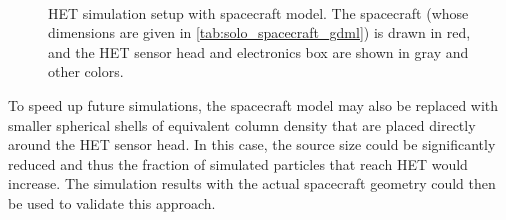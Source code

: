 \begin{figure}
{\begin{tikzpicture}
        \end{tikzpicture}
        \label{subfig:het_simulation_setup_sideview}
    }\\
    \caption[\acs{HET} simulation setup with spacecraft model]{\ac{HET} simulation setup with spacecraft model. The spacecraft (whose dimensions are given in \autoref{tab:solo_spacecraft_gdml}) is drawn in red, and the \ac{HET} sensor head and electronics box are shown in gray and other colors.}
    \label{fig:het_simulation_setup}
\end{figure}

To speed up future simulations, the spacecraft model may also be replaced with smaller spherical shells of equivalent column density that are placed directly around the \ac{HET} sensor head. In this case, the source size could be significantly reduced and thus the fraction of simulated particles that reach \ac{HET} would increase. The simulation results with the actual spacecraft geometry could then be used to validate this approach.

